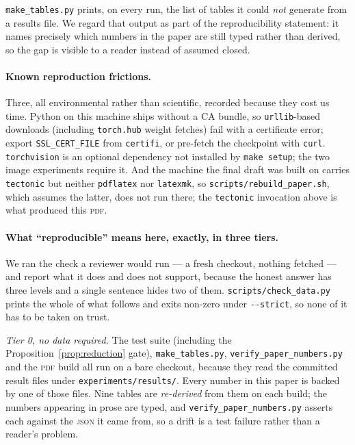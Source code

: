\texttt{make\_tables.py} prints, on every run, the list of tables it could \emph{not}
generate from a results file. We regard that output as part of the reproducibility
statement: it names precisely which numbers in the paper are still typed rather than
derived, so the gap is visible to a reader instead of assumed closed.

\paragraph{Known reproduction frictions.} Three, all environmental rather than scientific,
recorded because they cost us time. Python on this machine ships without a CA bundle, so
\texttt{urllib}-based downloads (including \texttt{torch.hub} weight fetches) fail with a
certificate error; export \texttt{SSL\_CERT\_FILE} from \texttt{certifi}, or pre-fetch the
checkpoint with \texttt{curl}. \texttt{torchvision} is an optional dependency not
installed by \texttt{make setup}; the two image experiments require it. And the machine the
final draft was built on carries \texttt{tectonic} but neither \texttt{pdflatex} nor
\texttt{latexmk}, so \texttt{scripts/rebuild\_paper.sh}, which assumes the latter, does not
run there; the \texttt{tectonic} invocation above is what produced this \textsc{pdf}.

\paragraph{What ``reproducible'' means here, exactly, in three tiers.} We ran the check a
reviewer would run --- a fresh checkout, nothing fetched --- and report what it does and does
not support, because the honest answer has three levels and a single sentence hides two of
them. \texttt{scripts/check\_data.py} prints the whole of what follows and exits non-zero
under \texttt{-{}-strict}, so none of it has to be taken on trust.

\emph{Tier 0, no data required.} The test suite (including the Proposition~\ref{prop:reduction}
gate), \texttt{make\_tables.py}, \texttt{verify\_paper\_numbers.py} and the \textsc{pdf} build
all run on a bare checkout, because they read the committed result files under
\texttt{experiments/results/}. Every number in this paper is backed by one of those files.
Nine tables are \emph{re-derived} from them on each build; the numbers appearing in prose are
typed, and \texttt{verify\_paper\_numbers.py} asserts each against the \textsc{json} it came
from, so a drift is a test failure rather than a reader's problem.

